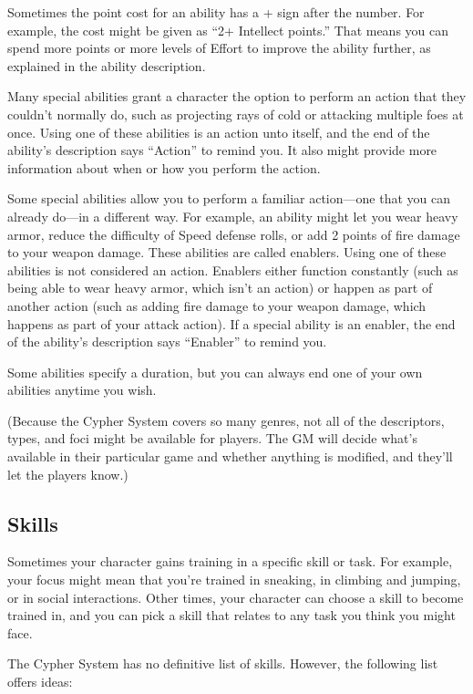 \begin{multicols}{2}
Sometimes the point cost for an ability has a + sign after the number. For example, the cost might be given as “2+ Intellect points.” That means you can spend more points or more levels of Effort to improve the ability further, as explained in the ability description.

Many special abilities grant a character the option to perform an action that they couldn’t normally do, such as projecting rays of cold or attacking multiple foes at once. Using one of these abilities is an action unto itself, and the end of the ability’s description says “Action” to remind you. It also might provide more information about when or how you perform the action.

Some special abilities allow you to perform a familiar action—one that you can already do—in a different way. For example, an ability might let you wear heavy armor, reduce the difficulty of Speed defense rolls, or add 2 points of fire damage to your weapon damage. These abilities are called enablers. Using one of these abilities is not considered an action. Enablers either function constantly (such as being able to wear heavy armor, which isn’t an action) or happen as part of another action (such as adding fire damage to your weapon damage, which happens as part of your attack action). If a special ability is an enabler, the end of the ability’s description says “Enabler” to remind you.

Some abilities specify a duration, but you can always end one of your own abilities anytime you wish.

(Because the Cypher System covers so many genres, not all of the descriptors, types, and foci might be available for players. The GM will decide what’s available in their particular game and whether anything is modified, and they’ll let the players know.)

\subsection{Skills}

Sometimes your character gains training in a specific skill or task. For example, your focus might mean that you’re trained in sneaking, in climbing and jumping, or in social interactions. Other times, your character can choose a skill to become trained in, and you can pick a skill that relates to any task you think you might face.

The Cypher System has no definitive list of skills. However, the following list offers ideas:


\end{multicols}
